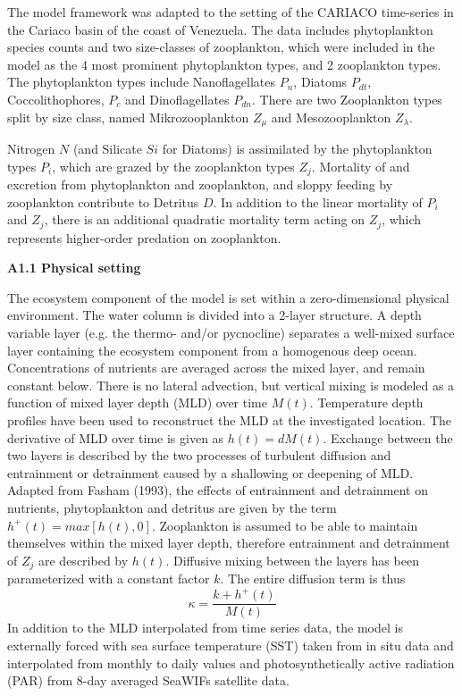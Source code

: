 The model framework was adapted to the setting of the CARIACO time-series in the Cariaco basin of the coast of Venezuela. The data includes phytoplankton species counts and two size-classes of zooplankton, which were included in the model as the 4 most prominent phytoplankton types, and 2 zooplankton types. The phytoplankton types include Nanoflagellates $P_{n}$, Diatoms $P_{dt}$, Coccolithophores, $P_{c}$ and Dinoflagellates $P_{dn}$. There are two Zooplankton types split by size class, named Mikrozooplankton $Z_{\mu}$ and Mesozooplankton $Z_{\lambda}$. 

Nitrogen $N$ (and Silicate $Si$ for Diatoms) is assimilated by the phytoplankton types $P_i$, which are grazed by the zooplankton types $Z_j$. Mortality of and excretion from phytoplankton and zooplankton, and sloppy feeding by zooplankton contribute to Detritus $D$. In addition to the linear mortality of $P_i$ and $Z_j$, there is an additional quadratic mortality term acting on $Z_j$, which represents higher-order predation on zooplankton.

{\bf {\large A1.1 Physical setting}}

The ecosystem component of the model is set within a zero-dimensional physical environment. The water column is divided into a 2-layer structure. A depth variable layer (e.g. the thermo- and/or pycnocline) separates a well-mixed surface layer containing the ecosystem component from a homogenous deep ocean. Concentrations of nutrients are averaged across the mixed layer, and remain constant below.  There is no lateral advection, but vertical mixing is modeled as a function of mixed layer depth (MLD) over time $M(t)$. Temperature depth profiles have been used to reconstruct the MLD at the investigated location. The derivative of MLD over time is given as $h(t) = dM(t)$. Exchange between the two layers is described by the two processes of turbulent diffusion and entrainment or detrainment caused by a shallowing or deepening of MLD. Adapted from Fasham (1993), the effects of entrainment and detrainment on nutrients, phytoplankton and detritus are given by the term $h^{+}(t)= max[h(t),0]$. Zooplankton is assumed to be able to maintain themselves within the mixed layer depth, therefore entrainment and detrainment of $Z_j$ are described by $h(t)$. Diffusive mixing between the layers has been parameterized with a constant factor $k$. The entire diffusion term is thus
\begin{equation}
\kappa = \frac{k + h^{+}(t)}{M(t)}
\end{equation}
In addition to the MLD interpolated from time series data, the model is externally forced with sea surface temperature (SST) taken from in situ data and interpolated from monthly to daily values and photosynthetically active radiation (PAR) from 8-day averaged SeaWIFs satellite data.

